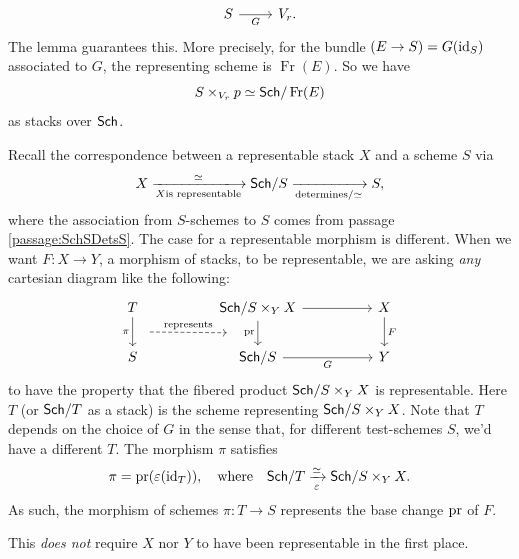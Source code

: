 \documentclass[12pt]{memoir}
\newcounter{passage}
\begin{document}
\begin{ptcb}
\[\begin{tikzcd}
            S \arrow[r, "G"'] & V_r.
        \end{tikzcd}
    \]
    The lemma guarantees this. More precisely, for the bundle \((E\to S)=G(\operatorname{id}_S)\) associated to \(G\), the representing scheme is \(\operatorname{Fr}(E)\). So we have
    \[
        S\times_{V_r}p\simeq\mathsf{Sch}/\operatorname{Fr}(E)
    \]
    as stacks over \(\mathsf{Sch}\).
    \tcbline 
    \begin{nonum-Rmk}
        Recall the correspondence between a representable stack \(X\) and a scheme \(S\) via
        \[
            X\xlongrightarrow[X \text{is representable}]{\isom}\Sch/S\xlongrightarrow[\text{determines}/\isom]{}S,
        \]
        where the association from \(S\)-schemes to \(S\) comes from passage \ref{passage:SchSDetsS}. The case for a representable morphism is different. When we want \(F:X\to Y\), a morphism of stacks, to be representable, we are asking \emph{any} cartesian diagram like the following:
        \begin{equation}\label{eq:representable-morphism-test}
            \begin{tikzcd}[column sep=5em]
                T \arrow[d, "\pi"', ""{name=scheme-column, anchor=center}]
                & \Sch/S\x_YX
                    \arrow[d, "\pr"', ""{name=stack-column, anchor=center}]
                    \arrow[r]
                & X \arrow[d, "F"] \\
                S & \Sch/S \arrow[r, "G"'] & Y
                \arrow[from=scheme-column, to=stack-column, dashed,
                    shorten <=1em, shorten >=2em,
                    "\text{represents}"{xshift=-.5em}]
            \end{tikzcd}
        \end{equation}
        to have the property that the fibered product \(\mathsf{Sch}/S\times_YX\) is representable. Here \(T\) (or \(\mathsf{Sch}/T\) as a stack) is the scheme representing \(\mathsf{Sch}/S\times_YX\). Note that \(T\) depends on the choice of \(G\) in the sense that, for different test-schemes \(S\), we'd have a different \(T\). The morphism \(\pi\) satisfies 
        \[
            \pi=\operatorname{pr}(\varepsilon(\operatorname{id}_T)),\quad\text{where}\quad\mathsf{Sch}/T\xrightarrow[\varepsilon]{\simeq}\mathsf{Sch}/S\times_YX.
        \]
        As such, the morphism of schemes \(\pi:T\to S\) represents the base change \(\operatorname{pr}\) of \(F\).\par
        This \emph{does not} require \(X\) nor \(Y\) to have been representable in the first place.
    \end{nonum-Rmk}
\end{ptcb}
\end{document}
